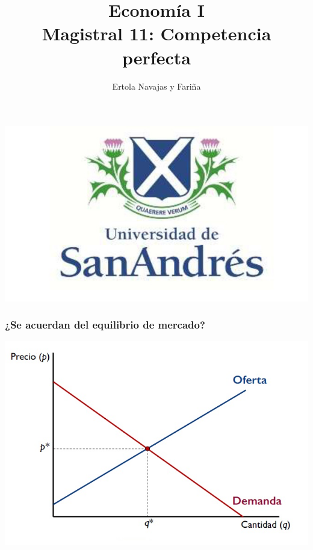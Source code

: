 \documentclass{beamer}
\title[Economía I]{Economía I \vspace{4mm}
\\ Magistral 11: Competencia perfecta}
\date{}
\author[Ertola Navajas y Fariña]{Ertola Navajas y Fariña}
\institute[]{Universidad de San Andrés}
\begin{document}
\begin{frame}
\titlepage
\centering
\includegraphics[scale=0.2]{Slides Principios de Economia/Figures/logoUDESA.jpg} 
\end{frame}


\begin{frame}
\frametitle{¿Se acuerdan del equilibrio de mercado?}
\includegraphics[scale=0.6]{Slides Principios de Economia/Figures/Tema_07.3_equilibrioofertademanda_0.jpg}
\end{frame}
\end{document}
